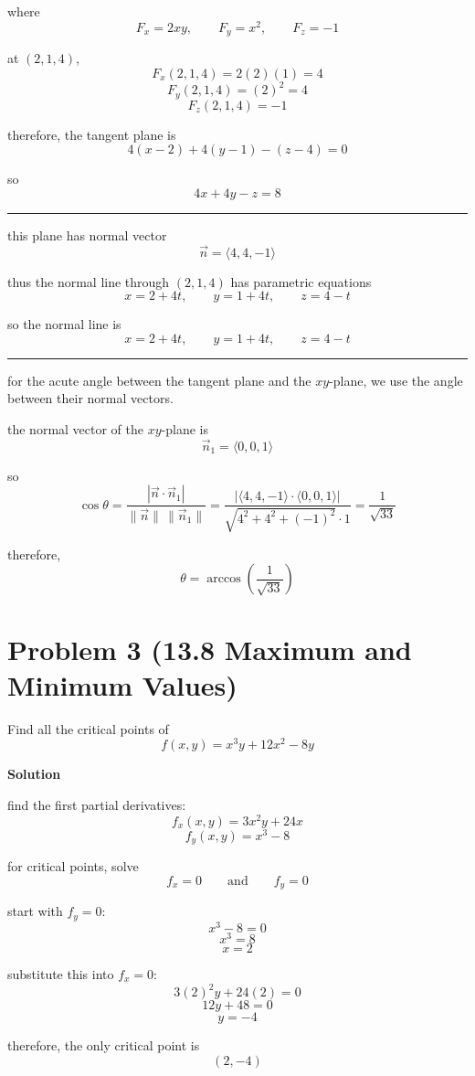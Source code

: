 \documentclass{article}
\newcommand{\solution}{\textbf{\large Solution}}
\theoremstyle{remark}
\begin{document}
where
\[
    F_x = 2xy, \qquad F_y = x^2, \qquad F_z = -1
\]

at $(2,1,4)$,
\[
    F_x(2,1,4) = 2(2)(1) = 4
\]
\[
    F_y(2,1,4) = (2)^2 = 4
\]
\[
    F_z(2,1,4) = -1
\]

therefore, the tangent plane is
\[
    4(x-2) + 4(y-1) - (z-4) = 0
\]

so
\[
    \boxed{4x + 4y - z = 8}
\]


    \medskip
    \begin{center}
    \rule{0.3\linewidth}{0.2pt}
    \end{center}
    \medskip


this plane has normal vector
\[
    \vec n = \langle 4,4,-1 \rangle
\]

thus the normal line through $(2,1,4)$ has parametric equations
\[
    x = 2 + 4t, \qquad y = 1 + 4t, \qquad z = 4 - t
\]

so the normal line is
\[
    \boxed{x = 2 + 4t, \qquad y = 1 + 4t, \qquad z = 4 - t}
\]


    \medskip
    \begin{center}
    \rule{0.3\linewidth}{0.2pt}
    \end{center}
    \medskip


for the acute angle between the tangent plane and the $xy$-plane, we use the angle between their normal vectors.

the normal vector of the $xy$-plane is
\[
    \vec n_1 = \langle 0,0,1 \rangle
\]

so
\[
    \cos \theta = \frac{|\vec n \cdot \vec n_1|}{\|\vec n\|\,\|\vec n_1\|}
    = \frac{|\langle 4,4,-1 \rangle \cdot \langle 0,0,1 \rangle|}{\sqrt{4^2+4^2+(-1)^2}\cdot 1}
    = \frac{1}{\sqrt{33}}
\]

therefore,
\[
    \boxed{\theta = \arccos\left(\frac{1}{\sqrt{33}}\right)}
\]

\vspace{1em}
\hrulefill

\section*{Problem 3 (13.8 Maximum and Minimum Values)}
Find all the critical points of
\[
    f(x,y) = x^3y + 12x^2 - 8y
\]

\medskip
\solution

find the first partial derivatives:
\[
    f_x(x,y) = 3x^2y + 24x
\]
\[
    f_y(x,y) = x^3 - 8
\]

for critical points, solve
\[
    f_x = 0 \qquad \text{and} \qquad f_y = 0
\]

start with $f_y = 0$:
\[
    x^3 - 8 = 0
\]
\[
    x^3 = 8
\]
\[
    x = 2
\]

substitute this into $f_x = 0$:
\[
    3(2)^2y + 24(2) = 0
\]
\[
    12y + 48 = 0
\]
\[
    y = -4
\]

therefore, the only critical point is
\[
    \boxed{(2,-4)}
\]
\end{document}

